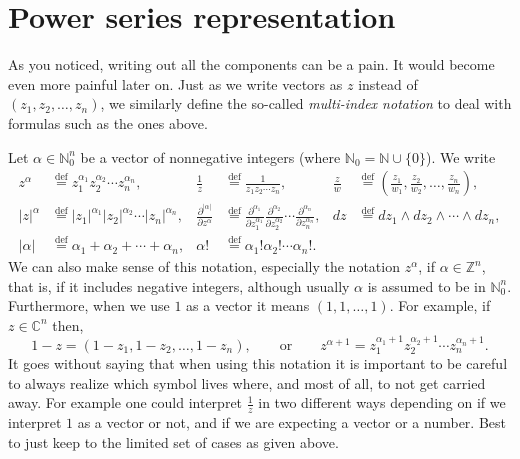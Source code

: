 \documentclass[12pt,openany]{book}
\newcommand{\sabs}[1]{\lvert {#1} \rvert}
\newcommand{\C}{{\mathbb{C}}}
\newcommand{\Z}{{\mathbb{Z}}}
\newcommand{\N}{{\mathbb{N}}}
\newcommand{\myindex}[1]{#1\index{#1}}
\theoremstyle{plain}
\theoremstyle{remark}
\theoremstyle{definition}
\theoremstyle{exercise}
\theoremstyle{example}
\begin{document}

\section{Power series representation}

As you noticed, writing out all the components can be a pain.  It would become
even more painful later on.  Just as we write 
vectors as $z$ instead of $(z_1,z_2,\ldots,z_n)$, we similarly
define the so-called
\emph{\myindex{multi-index notation}}
to deal with formulas such as the ones above.

Let $\alpha \in \N_0^n$
be a vector of nonnegative integers
%
(where $\N_0 = \N \cup \{ 0\}$).
We write
%
%
%
%
%
\begin{align*}
z^\alpha & \overset{\text{def}}{=} z_1^{\alpha_1}z_2^{\alpha_2} \cdots
z_n^{\alpha_n} ,
&
\frac{1}{z} & \overset{\text{def}}{=} \frac{1}{z_1z_2 \cdots z_n} ,
&
\frac{z}{w} & \overset{\text{def}}{=}
\left(\frac{z_1}{w_1}, \frac{z_2}{w_2}, \ldots, \frac{z_n}{w_n} \right) ,
\\
\sabs{z}^\alpha & \overset{\text{def}}{=} \sabs{z_1}^{\alpha_1}\sabs{z_2}^{\alpha_2} \cdots
\sabs{z_n}^{\alpha_n} ,
&
\frac{\partial^{\sabs{\alpha}}}{\partial z^\alpha} & \overset{\text{def}}{=}
\frac{\partial^{\alpha_1}}{\partial z_1^{\alpha_1}}
\frac{\partial^{\alpha_2}}{\partial z_2^{\alpha_2}}
\cdots
\frac{\partial^{\alpha_n}}{\partial z_n^{\alpha_n}} ,
&
dz & \overset{\text{def}}{=} dz_1 \wedge dz_2 \wedge \cdots \wedge dz_n ,
\\
\sabs{\alpha} & \overset{\text{def}}{=} \alpha_1 + \alpha_2 + \cdots + \alpha_n ,
&
\alpha! & \overset{\text{def}}{=} \alpha_1!\alpha_2! \cdots \alpha_n! .
\end{align*}
We can also make sense of this notation, especially the notation $z^\alpha$,
if $\alpha \in \Z^n$, that is, if it includes negative integers,
although usually $\alpha$ is assumed to be in $\N_0^n$.
Furthermore, when we use $1$ as a vector it means $(1,1,\ldots,1)$.
For example, if $z \in \C^n$ then,
\begin{equation*}
1-z = (1-z_1,1-z_2,\ldots,1-z_n) ,
\qquad \text{or} \qquad
z^{\alpha+1} = z_1^{\alpha_1+1}z_2^{\alpha_2+1} \cdots z_n^{\alpha_n+1} .
\end{equation*}
It goes without saying that when using this notation it is
important to be careful to always realize which symbol lives where,
and most of all, to not get carried away.  For
example one could interpret $\frac{1}{z}$ in two different ways depending
on if we interpret $1$ as a vector or not, and if we are
expecting a vector or a number.  Best to just keep to the limited set of
cases as given above.
\end{document}
